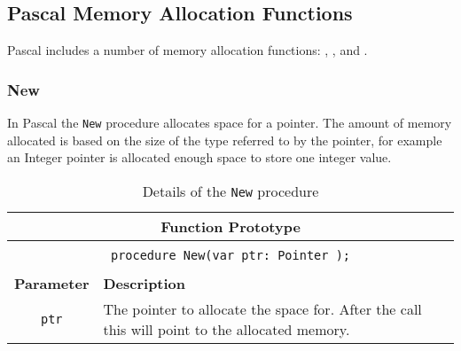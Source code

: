 \clearpage
\subsection{Pascal Memory Allocation Functions} %
\label{sub:pas_memory_allocation}

Pascal includes a number of memory allocation functions: , , and .

\subsubsection{New} %
\label{ssub:new}

In Pascal the \texttt{New} procedure allocates space for a pointer. The amount of memory allocated is based on the size of the type referred to by the pointer, for example an Integer pointer is allocated enough space to store one integer value.

\begin{table}[h]
  \centering
  \begin{tabular}{|c|p{9.5cm}|}
    \hline
    \multicolumn{2}{|c|}{\textbf{Function Prototype}} \\
    \hline
    \multicolumn{2}{|c|}{} \\
    \multicolumn{2}{|c|}{\texttt{procedure New(var ptr: Pointer );}} \\
    \multicolumn{2}{|c|}{} \\
    \hline
    \textbf{Parameter} & \textbf{Description} \\
    \hline
    \texttt{ ptr } & The pointer to allocate the space for. After the call this will point to the allocated memory. \\
    \hline
  \end{tabular}
  \caption{Details of the \texttt{New} procedure}
  \label{tbl:new}
\end{table}




